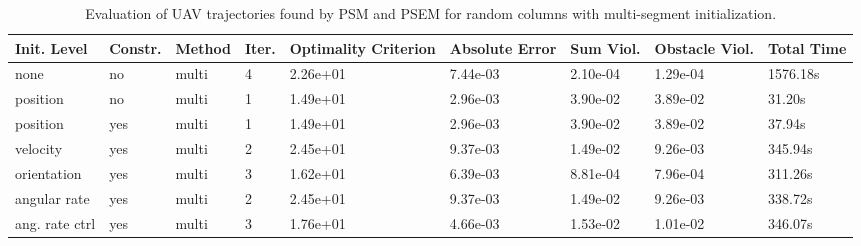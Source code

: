 \begin{table}
\small

\caption{Evaluation of UAV trajectories found by PSM and PSEM for random columns with multi-segment initialization.}
\label{tab:traj-plan-eval-random_columns-multi}
\begin{tabular}{p{21mm}p{9mm}p{12mm}p{6mm}p{14mm}p{14mm}p{14mm}p{14mm}p{14mm}}
\toprule
Init. Level & Constr. & Method & Iter. & Optimality Criterion & Absolute Error & Sum Viol. & Obstacle Viol. & Total Time \\
\midrule
none & no & multi & \cellcolor{color8} 4 & 2.26e+01 & 7.44e-03 & \cellcolor{color3} 2.10e-04 & \cellcolor{color3} 1.29e-04 & \cellcolor{color8} 1576.18s \\
position & no & multi & \cellcolor{color3} 1 & \cellcolor{color3} 1.49e+01 & \cellcolor{color3} 2.96e-03 & \cellcolor{color8} 3.90e-02 & \cellcolor{color8} 3.89e-02 & \cellcolor{color3} 31.20s \\
position & yes & multi & \cellcolor{color3} 1 & \cellcolor{color3} 1.49e+01 & \cellcolor{color3} 2.96e-03 & \cellcolor{color8} 3.90e-02 & \cellcolor{color8} 3.89e-02 & 37.94s \\
velocity & yes & multi & 2 & \cellcolor{color8} 2.45e+01 & \cellcolor{color8} 9.37e-03 & 1.49e-02 & 9.26e-03 & 345.94s \\
orientation & yes & multi & 3 & 1.62e+01 & 6.39e-03 & 8.81e-04 & 7.96e-04 & 311.26s \\
angular rate & yes & multi & 2 & \cellcolor{color8} 2.45e+01 & \cellcolor{color8} 9.37e-03 & 1.49e-02 & 9.26e-03 & 338.72s \\
ang. rate ctrl & yes & multi & 3 & 1.76e+01 & 4.66e-03 & 1.53e-02 & 1.01e-02 & 346.07s \\
\bottomrule
\end{tabular}
\end{table}
